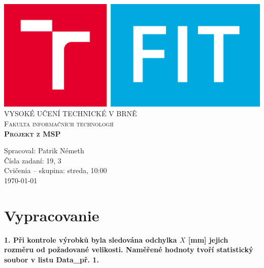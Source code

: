 \documentclass[pdftex, 11pt, a4paper, titlepage]{article}
\begin{document}
    \begin{titlepage}
        \begin{center}
            \includegraphics[scale=0.15]{FIT_logo.png}\\[1.2cm]
            \Huge
            \textsc{\MakeUppercase{Vysoké učení technické v Brně}\\[0.5cm]
                    Fakulta informačních technologií}\\
            
            \huge
            \textsc{\textbf{Projekt z MSP}}\\
        \end{center}

        \LARGE
        {\noindent
        Spracoval: Patrik Németh\\
        Čísla zadaní: 19, 3\\
        Cvičenia -- skupina: streda, 10:00\\
        \today\\}
    \end{titlepage}

    

    \section*{Vypracovanie}


    \textbf{1. Při kontrole výrobků byla sledována odchylka $X$ [mm] jejich
    rozměru od požadované velikosti. Naměřené hodnoty tvoří statistický soubor
    v listu Data\_př. 1.}\\
\end{document}
